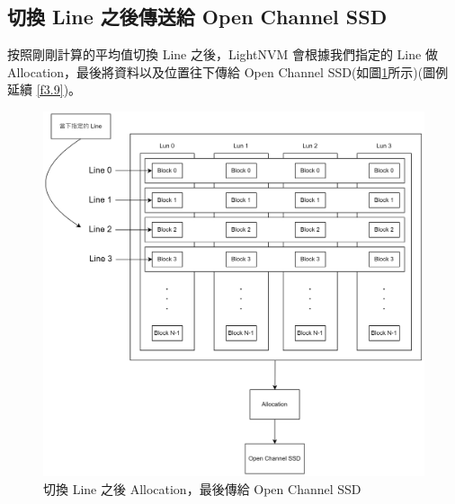 \subsection{切換 Line 之後傳送給 Open Channel SSD}\label{s3.3.2}
\indent
按照剛剛計算的平均值切換 Line 之後，LightNVM 會根據我們指定的 Line 做 Allocation，最後將資料以及位置往下傳給 Open Channel SSD(如圖\ref{f3.10}所示)(圖例延續 \ref{f3.9})。
\begin{figure}[H]
    \centering
    \includegraphics[width=1\textwidth]{picture/ch3/switch_line_to_opssd.drawio.png}
    \caption{切換 Line 之後 Allocation，最後傳給 Open Channel SSD}
    \label{f3.10}
\end{figure}